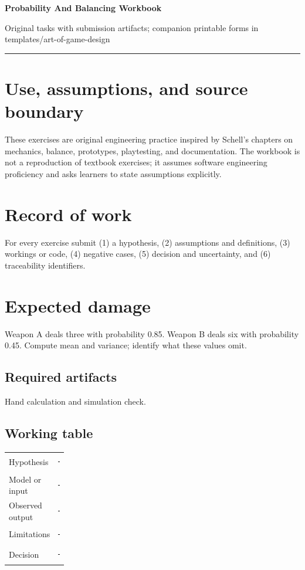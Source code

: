 \documentclass[11pt]{article}
\begin{document}
{\huge\bfseries\color{suiteblue} Probability And Balancing Workbook}\par
\vspace{0.15in}
{\normalsize\color{suitegray} Original tasks with submission artifacts; companion printable forms in templates/art-of-game-design}\par
\vspace{0.15in}\hrule\vspace{0.15in}

\section{Use, assumptions, and source boundary}
These exercises are original engineering practice inspired by Schell's chapters on mechanics, balance, prototypes, playtesting, and documentation. The workbook is not a reproduction of textbook exercises; it assumes software engineering proficiency and asks learners to state assumptions explicitly.


\section{Record of work}
For every exercise submit (1) a hypothesis, (2) assumptions and definitions, (3) workings or code, (4) negative cases, (5) decision and uncertainty, and (6) traceability identifiers.


\section{Expected damage}
Weapon A deals three with probability 0.85. Weapon B deals six with probability 0.45. Compute mean and variance; identify what these values omit.


\subsection{Required artifacts}
Hand calculation and simulation check.


\subsection{Working table}
\begin{tabularx}{\linewidth}{@{}p{0.20\linewidth}X@{}}\toprule
Hypothesis & \rule{0.90\linewidth}{0.4pt}\\[0.35cm]
Model or input & \rule{0.90\linewidth}{0.4pt}\\[0.35cm]
Observed output & \rule{0.90\linewidth}{0.4pt}\\[0.35cm]
Limitations & \rule{0.90\linewidth}{0.4pt}\\[0.35cm]
Decision & \rule{0.90\linewidth}{0.4pt}\\\bottomrule\end{tabularx}
\end{document}
